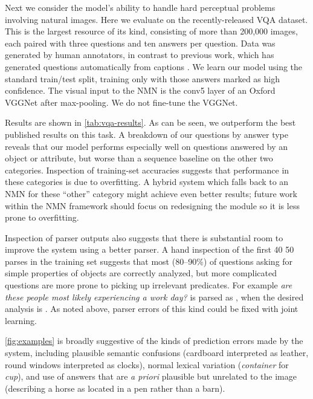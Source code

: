 Next we consider the model's ability to handle hard perceptual problems
involving natural images.  Here we evaluate on the recently-released VQA
dataset. This is the largest resource of its kind, consisting of more than
200,000 images, each paired with three questions and ten answers per question.
Data was generated by human annotators, in contrast to previous work, which has
generated questions automatically from captions \cite{Ren15VQA}.  We learn our
model using the standard train/test split, training only with those answers
marked as high confidence.  The visual input to the NMN is the conv5 layer of an
Oxford VGGNet \cite{Simonyan14VGG} after max-pooling. We do not fine-tune the
VGGNet.

Results are shown in \autoref{tab:vqa-results}. As can be seen, we outperform the best published
results on this task. A breakdown of our questions by answer type reveals that
our model performs especially well on questions answered by an object or
attribute, but worse than a sequence baseline on the other two categories.
Inspection of training-set accuracies suggests that performance in these
categories is due to overfitting. A hybrid system which falls back to an NMN for
these ``other'' category might achieve even better results; future work within
the NMN framework should focus on redesigning the 
module so it is less prone to overfitting.

Inspection of parser outputs also suggests that there is substantial room to
improve the system using a better parser. A hand inspection of the first 40
50 parses in the training set suggests that most (80--90\%) of questions asking
for simple properties of objects are correctly analyzed, but more complicated questions are
more prone to picking up irrelevant predicates. For example \emph{are these
people most likely experiencing a work day?} is parsed as , when the desired analysis is . As noted above,
parser errors of this kind could be fixed with joint learning.

\autoref{fig:examples} is broadly suggestive of the kinds of prediction errors made by the
system, including plausible semantic confusions (cardboard interpreted as
leather, round windows interpreted as clocks), normal lexical variation
(\emph{container} for \emph{cup}), and use of answers that are \emph{a priori}
plausible but unrelated to the image (describing a horse as located in a pen
rather than a barn).

